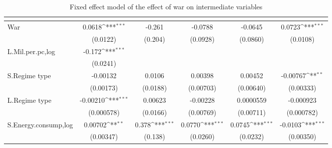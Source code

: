 \begin{table}[htbp]\centering
\def\sym#1{\ifmmode^{#1}\else\(^{#1}\)\fi}
\caption{Fixed effect model of the effect of war on intermediate variables\label{FEintermed}}
\begin{tabular}{l*{5}{c}}
\hline\hline
                    &&&&&\\
\hline
War                 &      0.0618\sym{***}&      -0.261         &     -0.0788         &     -0.0645         &      0.0723\sym{***}\\
                    &    (0.0122)         &     (0.204)         &    (0.0928)         &    (0.0860)         &    (0.0108)         \\
[1em]
L.Mil.per.pc,log    &      -0.172\sym{***}&                     &                     &                     &                     \\
                    &    (0.0241)         &                     &                     &                     &                     \\
[1em]
S.Regime type       &    -0.00132         &      0.0106         &     0.00398         &     0.00452         &    -0.00767\sym{**} \\
                    &   (0.00173)         &    (0.0188)         &   (0.00703)         &   (0.00640)         &   (0.00333)         \\
[1em]
L.Regime type       &    -0.00210\sym{***}&     0.00623         &    -0.00228         &   0.0000559         &   -0.000923         \\
                    &  (0.000578)         &    (0.0166)         &   (0.00769)         &   (0.00711)         &  (0.000782)         \\
[1em]
S.Energy.consump,log&     0.00702\sym{**} &       0.378\sym{***}&      0.0770\sym{***}&      0.0745\sym{***}&     -0.0103\sym{***}\\
                    &   (0.00347)         &     (0.138)         &    (0.0260)         &    (0.0232)         &   (0.00350)         \\

\end{tabular}
\end{table}
